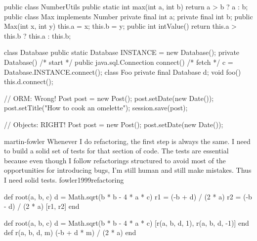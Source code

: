 \documentclass{article}
\begin{document}
\begin{lnSnippet}
public class NumberUtils {
  public static int max(int a, int b) {
    return a > b ? a : b;
  }
}
public class Max implements Number {
  private final int a;
  private final int b;
  public Max(int x, int y) { this.a = x; this.b = y; }
  public int intValue() {
    return this.a > this.b ? this.a : this.b;
  }
}
\end{lnSnippet}

\begin{lnSnippet}
class Database {
  public static Database INSTANCE = new Database();
  private Database() {  /* start */ }
  public java.sql.Connection connect() { /* fetch */ }
}
c = Database.INSTANCE.connect();
class Foo {
  private final Database d;
  void foo() {
    this.d.connect();
  }
}
\end{lnSnippet}

\begin{lnSnippet}
// ORM: Wrong!
Post post = new Post();
post.setDate(new Date());
post.setTitle("How to cook an omelette");
session.save(post);

// Objects: RIGHT!
Post post = new Post();
post.setDate(new Date());
\end{lnSnippet}


\lnQuote
  {martin-fowler}
  {Whenever I do refactoring, the first step is always the same. I need to build a solid set of tests for that section of code. The tests are essential because even though I follow refactorings structured to avoid most of the opportunities for introducing bugs, I'm still human and still make mistakes. Thus I need solid tests.}
  {fowler1999refactoring}

\begin{lnSnippet}[extract.rb]
def root(a, b, c)
  d = Math.sqrt(b * b - 4 * a * c)
  r1 = (-b + d) / (2 * a)
  r2 = (-b - d) / (2 * a)
  [r1, r2]
end

def root(a, b, c)
  d = Math.sqrt(b * b - 4 * a * c)
  [r(a, b, d, 1), r(a, b, d, -1)]
end
def r(a, b, d, m)
  (-b + d * m) / (2 * a)
end
\end{lnSnippet}
\end{document}
